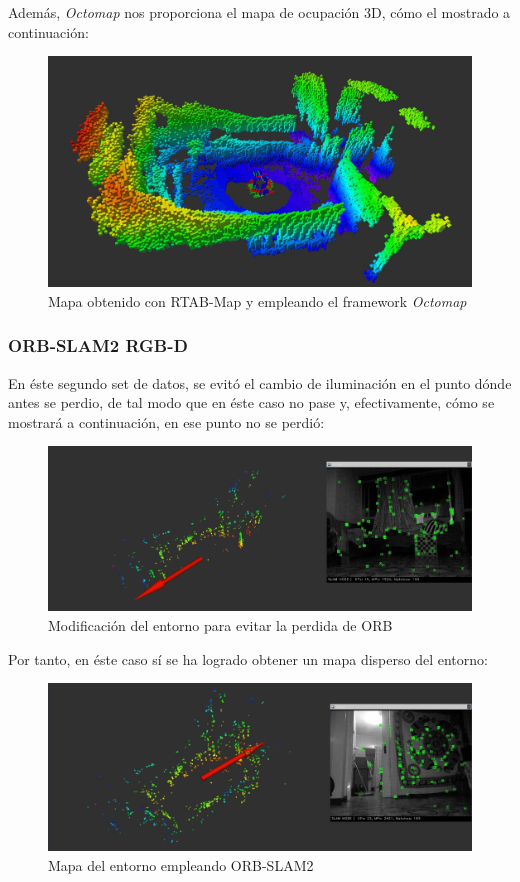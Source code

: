 Además, \textit{Octomap} nos proporciona el mapa de ocupación 3D, cómo el mostrado a continuación:
\begin{figure}[h!]
    \centering
    \includegraphics[width=.9\textwidth]{images/slam/bag3_octomap_LC}
    \caption{Mapa obtenido con RTAB-Map y empleando el framework \textit{Octomap}}
\end{figure}

\subsubsection{ORB-SLAM2 RGB-D}
En éste segundo set de datos, se evitó el cambio de iluminación en el punto dónde antes se perdio, de tal modo que en éste caso no pase y, efectivamente, cómo se mostrará a continuación,
en ese punto no se perdió:
\begin{figure}[h!]
    \centering
    \includegraphics[width=.9\textwidth]{images/slam/bag3_orb_avoidLOSE}
    \caption{Modificación del entorno para evitar la perdida de ORB}
\end{figure}

Por tanto, en éste caso sí se ha logrado obtener un mapa disperso del entorno:
\begin{figure}[h!]
    \centering
    \includegraphics[width=.9\textwidth]{images/slam/bag3_orb_map}
    \caption{Mapa del entorno empleando ORB-SLAM2}
\end{figure}

